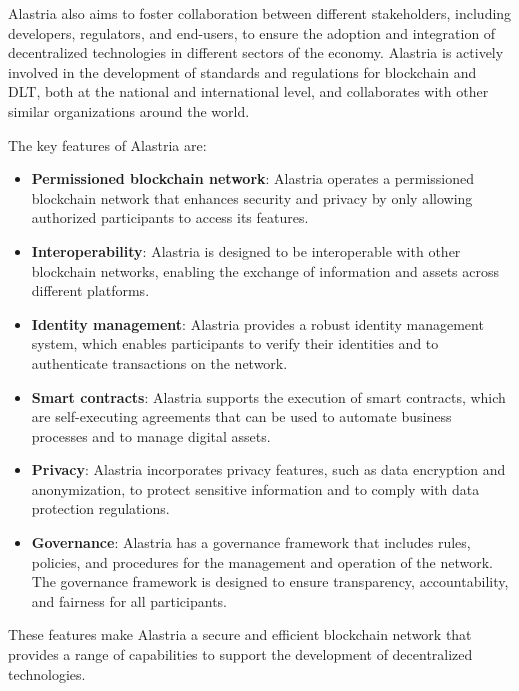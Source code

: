\documentclass[target=mst,aauheader=]{thud}
\begin{document}
    Alastria also aims to foster collaboration between different stakeholders, including developers, regulators, and end-users, to ensure the adoption and integration of decentralized technologies in different sectors of the economy. Alastria is actively involved in the development of standards and regulations for blockchain and DLT, both at the national and international level, and collaborates with other similar organizations around the world.

    The key features of Alastria are:

    \begin{itemize}
        \item \textbf{Permissioned blockchain network}: Alastria operates a permissioned blockchain network that enhances security and privacy by only allowing authorized participants to access its features.
        \item \textbf{Interoperability}: Alastria is designed to be interoperable with other blockchain networks, enabling the exchange of information and assets across different platforms.
        \item \textbf{Identity management}: Alastria provides a robust identity management system, which enables participants to verify their identities and to authenticate transactions on the network.
        \item \textbf{Smart contracts}: Alastria supports the execution of smart contracts, which are self-executing agreements that can be used to automate business processes and to manage digital assets.
        \item \textbf{Privacy}: Alastria incorporates privacy features, such as data encryption and anonymization, to protect sensitive information and to comply with data protection regulations.
        \item \textbf{Governance}: Alastria has a governance framework that includes rules, policies, and procedures for the management and operation of the network. The governance framework is designed to ensure transparency, accountability, and fairness for all participants.
    \end{itemize}

    These features make Alastria a secure and efficient blockchain network that provides a range of capabilities to support the development of decentralized technologies.
\end{document}
